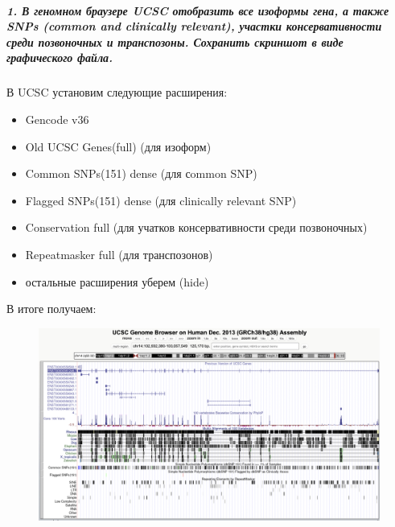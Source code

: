 \documentclass[12pt]{article}
\begin{document}
\subparagraph{1. В геномном браузере UCSC отобразить все изоформы гена, а также SNPs (common and clinically relevant), участки консервативности среди позвоночных и транспозоны. Сохранить скриншот в виде графического файла.\\}
В UCSC установим следующие расширения:
\begin{itemize}
\setlength\itemsep{0.05em}
\item Gencode v36
\item Old UCSC Genes(full) (для изоформ)
\item Common SNPs(151) dense (для сommon SNP)
\item Flagged SNPs(151) dense (для clinically relevant SNP)
\item Conservation full (для учатков консервативности среди позвоночных)
\item Repeatmasker full (для транспозонов)
\item остальные расширения уберем (hide)
\end{itemize}
В итоге получаем:
\begin{figure}[H]
\centering
\includegraphics[width=17cm]{image/image11.png}
\end{figure}
\pagebreak
\end{document}
